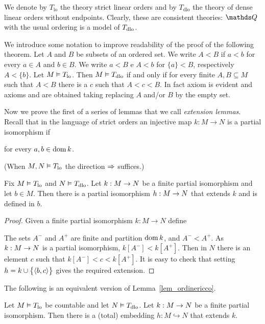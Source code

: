 \documentclass[creche.tex]{subfiles}
\begin{document}
We denote by \emph{$T_{\textrm{lo}}$} the theory strict linear orders and by \emph{$T_{\textrm{dlo}}$} the theory of dense linear orders without endpoints.
Clearly, these are consistent theories: $\QQ$ with the usual ordering is a model of $T_{\rm dlo}$.

We introduce some notation to improve readability of the proof of the following theorem.
Let $A$ and $B$ be subsets of an ordered set.
We write $A<B$ if $a<b$ for every $a\in A$ and $b\in B$.
We write $a<B$ e $A<b$ for $\{a\}<B$, respectively $A<\{b\}$.
Let $M\models T_{\rm lo}$.
Then $M\models T_{\rm dlo}$ if and only if for every finite $A, B\subseteq M$ such that $A<B$ there is a $c$ such that  $A<c<B$.
In fact axiom  is evident and axioms  and  are obtained taking replacing $A$ and/or $B$ by the empty set.

Now we prove the first of a series of lemmas that we call \emph{extension lemmas}.
Recall that in the language of strict orders an injective map $k:M\to N$ is a partial isomorphism if 

\hfill for every $a,b\in\dom k$.

(When $M,N\models T_{\rm lo}$ the direction $\IMP$ suffices.)

\begin{lemma}\label{lem_ordinericco}
Fix $M\models T_{\rm lo}$ and $N\models T_{\rm dlo}$.
Let $k:M\imp N$ be a finite partial isomorphism and let $b\in M$.
Then there is a partial isomorphism $h:M\imp N$ that extends $k$ and is defined in $b$.
\end{lemma}

\begin{proof}
Given a finite partial isomorphism $k:M\to N$ define



The sets $A^-$ and $A^+$ are finite and partition $\dom k$, and  $A^-<A^+$.
As $k:M\imp N$ is a partial isomorphism, $k[A^-]<k[A^+]$.
Then in $N$ there is an element $c$ such that $k[A^-]<c<k[A^+]$.
It is easy to check that setting $h=k\cup\big\{\<b,c\>\big\}$ gives the required extension.
\end{proof}

The following is an equivalent version of Lemma~\ref{lem_ordinericco}.

\begin{corollary}\label{coroll_ordinericco}
Let $M\models T_{\rm lo}$ be countable and let $N\models T_{\rm dlo}$.
Let $k:M\imp N$ be a finite partial isomorphism.
Then there is a (total) embedding $h:M\hookrightarrow N$ that extends $k$.
\end{corollary}
\end{document}
